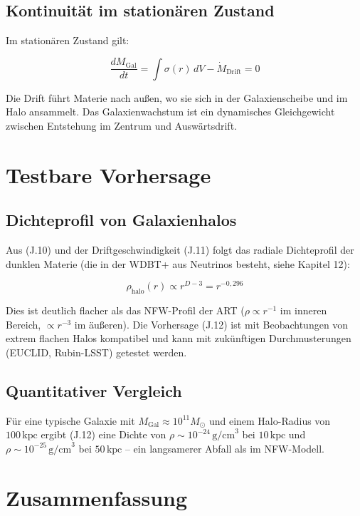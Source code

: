 \subsection{Kontinuität im stationären Zustand}

Im stationären Zustand gilt:

\[
\frac{dM_{\text{Gal}}}{dt} = \int \sigma(r) \, dV - \dot{M}_{\text{Drift}} = 0
\]

Die Drift führt Materie nach außen, wo sie sich in der Galaxienscheibe und im Halo 
ansammelt. Das Galaxienwachstum ist ein dynamisches Gleichgewicht zwischen 
Entstehung im Zentrum und Auswärtsdrift.

\section{Testbare Vorhersage}

\subsection{Dichteprofil von Galaxienhalos}

Aus (J.10) und der Driftgeschwindigkeit (J.11) folgt das radiale Dichteprofil der 
dunklen Materie (die in der WDBT+ aus Neutrinos besteht, siehe Kapitel 12):

\[
\rho_{\text{halo}}(r) \propto r^{D-3} = r^{-0,296} \tag{J.12}
\]

Dies ist deutlich flacher als das NFW-Profil der ART (\( \rho \propto r^{-1} \) im inneren 
Bereich, \( \propto r^{-3} \) im äußeren). Die Vorhersage (J.12) ist mit Beobachtungen 
von extrem flachen Halos kompatibel und kann mit zukünftigen Durchmusterungen 
(EUCLID, Rubin-LSST) getestet werden.

\subsection{Quantitativer Vergleich}

Für eine typische Galaxie mit \( M_{\text{Gal}} \approx 10^{11} M_{\odot} \) und einem 
Halo-Radius von \( 100 \, \text{kpc} \) ergibt (J.12) eine Dichte von 
\( \rho \sim 10^{-24} \, \text{g/cm}^3 \) bei \( 10 \, \text{kpc} \) und 
\( \rho \sim 10^{-25} \, \text{g/cm}^3 \) bei \( 50 \, \text{kpc} \) – ein langsamerer 
Abfall als im NFW-Modell.

\section{Zusammenfassung}

